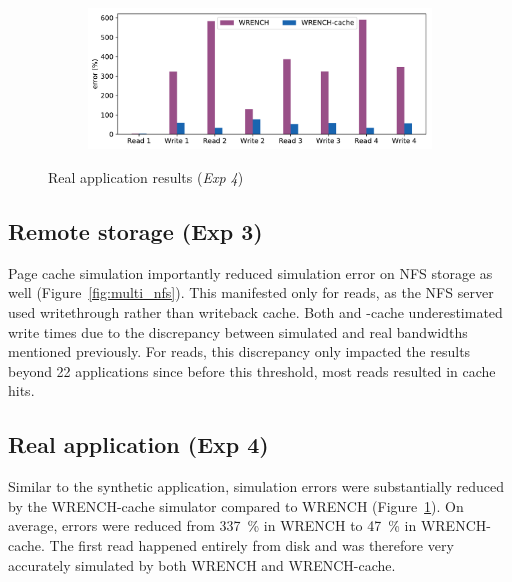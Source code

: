 \begin{figure}[b]
    \begin{subfigure}{0.95\linewidth}
        \centering
        \includegraphics[width=\linewidth]{result/nighres/figures/nighres_errors.pdf}
    \end{subfigure}
    \caption{Real application results (\textit{Exp 4})}
    \label{fig:nighres}
\end{figure}

\subsection{Remote storage (Exp 3)}

Page cache simulation importantly reduced simulation error
on NFS storage as well (Figure~\ref{fig:multi_nfs}). This
manifested only for reads, as the NFS server used writethrough rather than writeback cache.
Both \wrench and \wrench-cache
underestimated write times due to the discrepancy between
simulated and real bandwidths mentioned previously. For reads,
this discrepancy only impacted the results beyond 22
applications since before this threshold, most reads resulted in cache
hits.


\subsection{Real application (Exp 4)}
Similar to the synthetic application, simulation errors were
substantially reduced by the WRENCH-cache simulator compared to
WRENCH (Figure~\ref{fig:nighres}). On average, errors were reduced
from 337~\% in WRENCH to 47~\% in WRENCH-cache. 
The first read happened entirely from disk and was therefore 
very accurately simulated by both WRENCH and WRENCH-cache.

